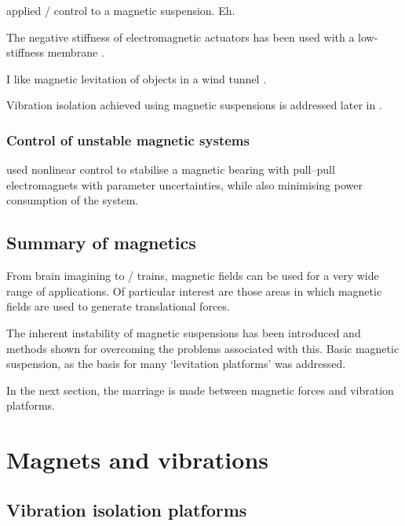\textcite{gosiewski2008} applied \Hinf/ control to a magnetic suspension.
Eh.

The negative stiffness of electromagnetic actuators has been used with a low-stiffness membrane \cite{sato2001}.

I like magnetic levitation of objects in a wind tunnel \cite{higuchi2008}.

Vibration isolation achieved using magnetic suspensions is addressed later in .


\subsubsection{Control of unstable magnetic systems}

\textcite{queiroz2007} used nonlinear control to stabilise a magnetic bearing with pull--pull electromagnets with parameter uncertainties, while also minimising power consumption of the system.



\subsection{Summary of magnetics}

From brain imagining to \maglev/ trains, magnetic fields can be used for a very wide range of applications. Of particular interest are those areas in which magnetic fields are used to generate translational forces.

The inherent instability of magnetic suspensions has been introduced and methods shown for overcoming the problems associated with this.
Basic magnetic suspension, as the basis for many `levitation platforms' was addressed.

In the next section, the marriage is made between magnetic forces and vibration platforms.


\section{Magnets and vibrations}

\subsection{Vibration isolation platforms}

